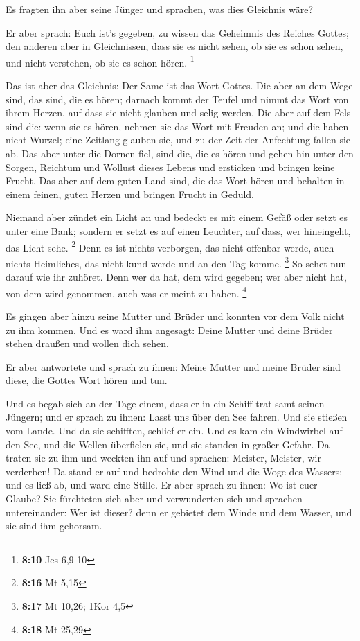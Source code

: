  Es fragten ihn aber seine Jünger und sprachen, was dies
Gleichnis wäre?

 Er aber sprach: Euch ist's gegeben, zu wissen das
Geheimnis des Reiches Gottes; den anderen aber in Gleichnissen, dass sie
es nicht sehen, ob sie es schon sehen, und nicht verstehen, ob sie es
schon hören. \footnote{\textbf{8:10} Jes 6,9-10}

 Das ist aber das Gleichnis: Der Same ist das Wort Gottes.
 Die aber an dem Wege sind, das sind, die es hören; darnach
kommt der Teufel und nimmt das Wort von ihrem Herzen, auf dass sie nicht
glauben und selig werden.  Die aber auf dem Fels sind die:
wenn sie es hören, nehmen sie das Wort mit Freuden an; und die haben
nicht Wurzel; eine Zeitlang glauben sie, und zu der Zeit der Anfechtung
fallen sie ab.  Das aber unter die Dornen fiel, sind die,
die es hören und gehen hin unter den Sorgen, Reichtum und Wollust dieses
Lebens und ersticken und bringen keine Frucht.  Das aber
auf dem guten Land sind, die das Wort hören und behalten in einem
feinen, guten Herzen und bringen Frucht in Geduld.

 Niemand aber zündet ein Licht an und bedeckt es mit einem
Gefäß oder setzt es unter eine Bank; sondern er setzt es auf einen
Leuchter, auf dass, wer hineingeht, das Licht sehe. \footnote{\textbf{8:16}
  Mt 5,15}  Denn es ist nichts verborgen, das nicht
offenbar werde, auch nichts Heimliches, das nicht kund werde und an den
Tag komme. \footnote{\textbf{8:17} Mt 10,26; 1Kor 4,5}  So
sehet nun darauf wie ihr zuhöret. Denn wer da hat, dem wird gegeben; wer
aber nicht hat, von dem wird genommen, auch was er meint zu haben.
\footnote{\textbf{8:18} Mt 25,29}

 Es gingen aber hinzu seine Mutter und Brüder und konnten
vor dem Volk nicht zu ihm kommen.  Und es ward ihm
angesagt: Deine Mutter und deine Brüder stehen draußen und wollen dich
sehen.

 Er aber antwortete und sprach zu ihnen: Meine Mutter und
meine Brüder sind diese, die Gottes Wort hören und tun.

 Und es begab sich an der Tage einem, dass er in ein Schiff
trat samt seinen Jüngern; und er sprach zu ihnen: Lasst uns über den See
fahren. Und sie stießen vom Lande.  Und da sie schifften,
schlief er ein. Und es kam ein Windwirbel auf den See, und die Wellen
überfielen sie, und sie standen in großer Gefahr.  Da
traten sie zu ihm und weckten ihn auf und sprachen: Meister, Meister,
wir verderben! Da stand er auf und bedrohte den Wind und die Woge des
Wassers; und es ließ ab, und ward eine Stille.  Er aber
sprach zu ihnen: Wo ist euer Glaube? Sie fürchteten sich aber und
verwunderten sich und sprachen untereinander: Wer ist dieser? denn er
gebietet dem Winde und dem Wasser, und sie sind ihm gehorsam.

